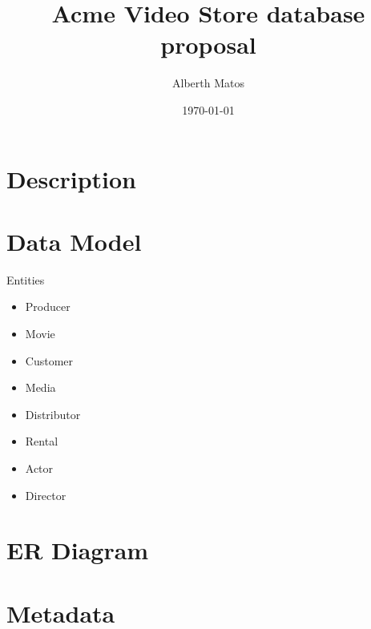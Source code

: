 \documentclass[letterpaper,12pt]{article}
\title{\large{Acme Video Store database proposal}}
\author{Alberth Matos}
\date{\today}
\begin{document}
\fancyhead{}

\maketitle

\section{Description}

\section{Data Model}
Entities
\begin{itemize}
\item Producer
\item Movie
\item Customer
\item Media
\item Distributor
\item Rental
\item Actor
\item Director
\end{itemize}
\section{ER Diagram}

\section{Metadata}
\end{document}

